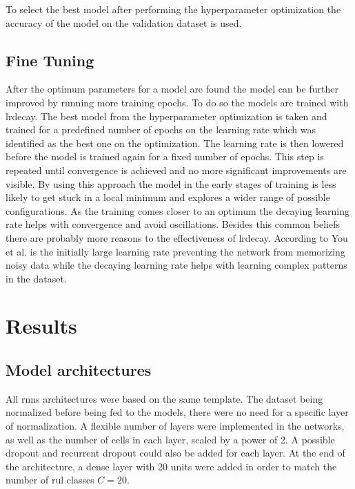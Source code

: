 \documentclass[conference]{IEEEtran}
\begin{document}
To select the best model after performing the hyperparameter optimization the accuracy of the model on the validation dataset is used.

\subsection{Fine Tuning}
\label{sec:fine_tuning}

After the optimum parameters for a model are found the model can be further improved by running more training epochs. To do so the models are trained with \gls{lrdecay}. The best model from the hyperparameter optimization is taken and trained for a predefined number of epochs on the learning rate which was identified as the best one on the optimization. The learning rate is then lowered before the model is trained again for a fixed number of epochs. This step is repeated until convergence is achieved and no more significant improvements are visible. By using this approach the model in the early stages of training is less likely to get stuck in a local minimum and explores a wider range of possible configurations. As the training comes closer to an optimum the decaying learning rate helps with convergence and avoid oscillations. Besides this common beliefs there are probably more reasons to the effectiveness of \gls{lrdecay}. According to You et al. \cite{You2019} is the initially large learning rate preventing the network from memorizing noisy data while the decaying learning rate helps with learning complex patterns in the dataset.


\section{Results}
\label{sec:results}


\subsection{Model architectures}
\label{sec:model_architectures}

All \glspl{rnn} architectures were based on the same template. The dataset being normalized before being fed to the models, there were no need for a specific layer of normalization. A flexible number of layers were implemented in the networks, as well as the number of cells in each layer, scaled by a power of 2. A possible dropout and recurrent dropout could also be added for each layer. At the end of the architecture, a dense layer with 20 units were added in order to match the number of \gls{rul} classes $ C = 20 $.  
\end{document}
